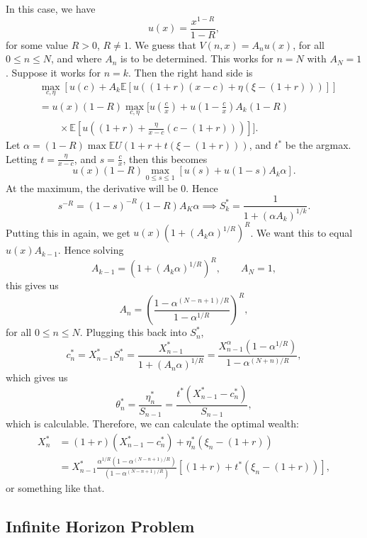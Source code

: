 \documentclass[12pt]{article}
\begin{document}
\begin{exbox}
	In this case, we have
	\[
	u(x) = \frac{x^{1-R}}{1 - R},
	\]
	for some value $R > 0$, $R \neq 1$. We guess that $V(n, x) = A_n u(x)$, for all $0 \leq n \leq N$, and where $A_n$ is to be determined. This works for $n = N$ with $A_N = 1$. Suppose it works for $n = k$. Then the right hand side is
	\begin{align*}
		&\max_{c, \eta} \left[ u(c) + A_k \mathbb{E}\left[ u((1 + r)(x - c) + \eta(\xi - (1+r)))\right] \right] \\
		&= u(x) (1 - R) \max_{c, \eta} \biggl[ u \left( \frac{c}{x} \right) + u \left(1 - \frac{c}{x} \right) A_k (1 - R)  \\
		& \qquad \times \mathbb{E}\left[ u\left((1 + r) + \frac{\eta}{x - c} (c - (1 + r)) \right)  \right] \biggr].
	\end{align*}
	Let $\alpha = (1 -R) \max \mathbb{E} U(1 + r + t (\xi - (1 + r)))$, and $t^\ast$ be the argmax. Letting $t = \frac{\eta}{x - c}$, and $s = \frac{c}{x}$, then this becomes
	\[
		u(x)(1 - R) \max_{ 0 \leq s \leq 1} [u(s) + u(1 - s) A_k \alpha ].
	\]
	At the maximum, the derivative will be 0. Hence
	\[
	s^{-R} = (1-s)^{-R}(1 - R)A_K \alpha \implies S^\ast_k = \frac{1}{1 + (\alpha A_k)^{1/k}}.
	\]
	Putting this in again, we get $u(x)(1 + (A_k \alpha)^{1/R})^{R}$. We want this to equal $u(x) A_{k-1}$. Hence solving
	\[
	A_{k-1} = (1 + (A_k \alpha)^{1/R})^{R}, \qquad A_N = 1,
	\]
	this gives us
	\[
	A_n = \left( \frac{1 - \alpha^{(N - n + 1)/R}}{1 - \alpha^{1/R}} \right)^R,
	\]
	for all $0 \leq n \leq N$. Plugging this back into $S_n^\ast$,
	\[
	c_n^\ast = X_{n-1}^{\ast} S_n^{\ast} = \frac{X_{n-1}^{\ast}}{1 + (A_n\alpha)^{1/R}} = \frac{X_{n-1}^\alpha(1 - \alpha^{1/R})}{1 - \alpha^{(N+n)/R}},
	\]
	which gives us
	\[
	\theta_n^{\ast} = \frac{\eta_n^{\ast}}{S_{n-1}} = \frac{t^{\ast} (X_{n-1}^\ast - c_n^\ast)}{S_{n-1}},
	\]
	which is calculable. Therefore, we can calculate the optimal wealth:
	\begin{align*}
		X_n^\ast &= (1 + r)(X_{n-1}^\ast - c_n^\ast) + \eta_n^\ast (\xi_n - (1 + r)) \\
			 &= X_{n-1}^\ast \frac{\alpha^{1/R}(1 - \alpha^{(N - n + 1)/R})}{(1 - \alpha^{(N - n + 1)/R})}[(1 + r) + t^\ast(\xi_n - (1 + r))],
	\end{align*}
	or something like that.
\end{exbox}

\subsection{Infinite Horizon Problem}
\label{sub:inf_hor}
\end{document}
